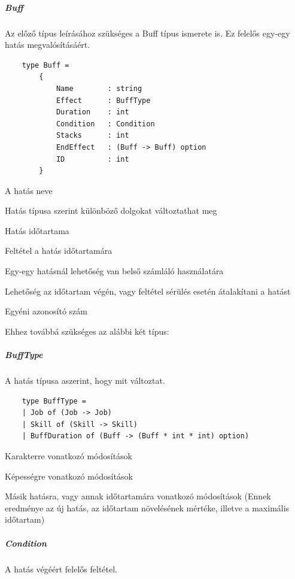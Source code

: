 \documentclass[12pt]{article}
\begin{document}
	\subparagraph{Buff}
	
	Az előző típus leírásához szükséges a Buff típus ismerete is. Ez felelős egy-egy hatás megvalósításáért.
	
	\begin{lstlisting}
	type Buff =
		{
			Name        : string
			Effect      : BuffType
			Duration    : int
			Condition   : Condition
			Stacks      : int
			EndEffect   : (Buff -> Buff) option
			ID          : int
		}
	\end{lstlisting}
	
	\begin{description}[align=left,labelwidth=2.5cm]
		\item [Name] A hatás neve
		\item [Effect] Hatás típusa szerint különböző dolgokat változtathat meg
		\item [Duration] Hatás időtartama
		\item [Condition] Feltétel a hatás időtartamára
		\item [Stacks] Egy-egy hatásnál lehetőség van belső számláló használatára
		\item [EndEffect] Lehetőség az időtartam végén, vagy feltétel sérülés esetén átalakítani a hatást
		\item [ID] Egyéni azonosító szám
	\end{description}
	
	Ehhez továbbá szükséges az alábbi két típus:
	
	\subparagraph{BuffType} A hatás típusa aszerint, hogy mit változtat.
	
	\begin{lstlisting}
	type BuffType =
	| Job of (Job -> Job)
	| Skill of (Skill -> Skill)
	| BuffDuration of (Buff -> (Buff * int * int) option)
	\end{lstlisting}
	
	\begin{description}[align=left,labelwidth=2.5cm]
		\item [Job] Karakterre vonatkozó módosítások
		\item [Skill] Képességre vonatkozó módosítások
		\item [BuffDuration] Másik hatásra, vagy annak időtartamára vonatkozó módosítások (Ennek eredménye az új hatás, az időtartam növelésének mértéke, illetve a maximális időtartam)
	\end{description}
	
	\subparagraph{Condition} A hatás végéért felelős feltétel.
	
\end{document}
